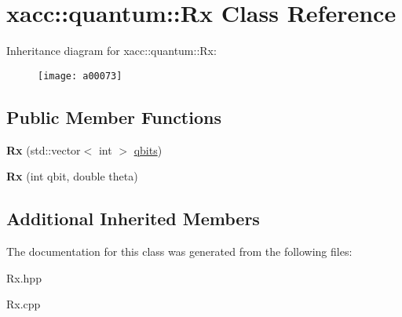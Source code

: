 \hypertarget{a00073}{}\section{xacc\+:\+:quantum\+:\+:Rx Class Reference}
\label{a00073}
Inheritance diagram for xacc\+:\+:quantum\+:\+:Rx\+:\begin{figure}[H]
\begin{center}
\leavevmode
\texttt{[image: a00073]}
\end{center}
\end{figure}
\subsection*{Public Member Functions}
\begin{DoxyCompactItemize}
\item 
{\bfseries Rx} (std\+::vector$<$ int $>$ \hyperlink{a00041_a2a56be6c2519ea65df4d06f4abae1393}{qbits})\hypertarget{a00073_a03babfe938a6cbf7f744fcd31a52d92d}{}\label{a00073_a03babfe938a6cbf7f744fcd31a52d92d}

\item 
{\bfseries Rx} (int qbit, double theta)\hypertarget{a00073_a01667b11d34d5621b98ebff9a07d9bbf}{}\label{a00073_a01667b11d34d5621b98ebff9a07d9bbf}

\end{DoxyCompactItemize}
\subsection*{Additional Inherited Members}


The documentation for this class was generated from the following files\+:\begin{DoxyCompactItemize}
\item 
Rx.\+hpp\item 
Rx.\+cpp\end{DoxyCompactItemize}
